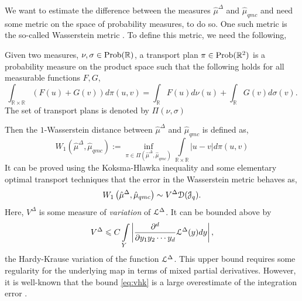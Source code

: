 \documentclass[a4paper]{article}
\numberwithin{equation}{section}
\numberwithin{equation}{section}
\theoremstyle{definition}
\theoremstyle{myremarkstyle}
\renewcommand{\leq}{\leqslant}
\newcommand{\R}{\mathbb{R}}
\newcommand{\map}{\EuScript{L}}
\newcommand{\Jq}{\EuScript{J}_q}
\newcommand{\Ds}{\EuScript{D}}
\begin{document}
We want to estimate the difference between the measures $\hat{\mu}^{\Delta}$ and $\hat{\mu}_{qmc}$ and need some metric on the space of probability measures, to do so. One such metric is the so-called Wasserstein metric \cite{VIL1}. To define this metric, we need the following, 
\begin{definition}
Given two measures, $\nu,\sigma \in {\rm Prob}(\R)$, a transport plan $\pi\in {\rm Prob}(\R^2)$ is a probability measure on the product space such that the following holds for all measurable functions $F,G$,
\begin{equation}
\label{eq:w1}
\int_{\R \times \R} (F(u) + G(v)) d\pi(u,v) = \int_{\R} F(u) d\nu(u) + \int_{\R} G(v) d\sigma(v).
\end{equation}
The set of transport plans is denoted by $\Pi(\nu,\sigma)$
\end{definition} 
Then the $1$-Wasserstein distance \cite{VIL1} between $\hat{\mu}^{\Delta}$ and $\hat{\mu}_{qmc}$ is defined as,
\begin{equation}
\label{eq:w2}
W_1\left(\hat{\mu}^{\Delta}, \hat{\mu}_{qmc} \right) := \inf\limits_{\pi \in \Pi\left(\hat{\mu}^{\Delta}, \hat{\mu}_{qmc}\right)} \int\limits_{\R \times \R} |u - v| d\pi(u,v)
\end{equation}
It can be proved using the Koksma-Hlawka inequality and some elementary optimal transport techniques that the 
error in the Wasserstein metric behaves as,
\begin{equation}
\label{eq:m3}
W_1\left(\hat{\mu}^{\Delta}, \hat{\mu}_{qmc} \right) \sim V^{\Delta} \Ds(\Jq).
\end{equation}
Here, $V^{\Delta}$ is some measure of \emph{variation} of $\map^{\Delta}$. It can be bounded above by
\begin{equation}
\label{eq:vhk}
V^{\Delta}  \leq C \int\limits_{Y} \left | \frac{\partial^{d}}{\partial y_1 y_2 \cdots y_d} \map^{\Delta}(y) dy \right|,
\end{equation}
the Hardy-Krause variation of the function $\map^{\Delta}$. This upper bound requires some regularity for the underlying map in terms of mixed partial derivatives. However, it is well-known that the bound \eqref{eq:vhk} is a large overestimate of the integration error \cite{CAF1}. 
\end{document}
